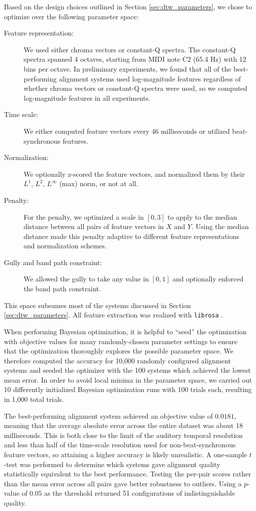 Based on the design choices outlined in Section \ref{sec:dtw_parameters}, we chose to optimize over the following parameter space:
\begin{description}
\item[Feature representation:] We used either chroma vectors or constant-Q spectra.
The constant-Q spectra spanned 4 octaves, starting from MIDI note C2 (65.4 Hz) with 12 bins per octave.
In preliminary experiments, we found that all of the best-performing alignment systems used log-magnitude features regardless of whether chroma vectors or constant-Q spectra were used, so we computed log-magnitude features in all experiments.
\item[Time scale:] We either computed feature vectors every 46 milliseconds or utilized beat-synchronous features.
\item[Normalization:] We optionally z-scored the feature vectors, and normalized them by their $L^1$, $L^2$, $L^\infty$ (max) norm, or not at all.
\item[Penalty:] For the penalty, we optimized a scale in $[0, 3]$ to apply to the median distance between all pairs of feature vectors in $X$ and $Y$.
Using the median distance made this penalty adaptive to different feature representations and normalization schemes.
\item[Gully and band path constraint:] We allowed the gully to take any value in $[0, 1]$ and optionally enforced the band path constraint.
\end{description}
This space subsumes most of the systems discussed in Section \ref{sec:dtw_parameters}.
All feature extraction was realized with \texttt{librosa} \cite{mcfee2015librosa, mcfee2015librosa_scipy}.

When performing Bayesian optimization, it is helpful to ``seed'' the optimization with objective values for many randomly-chosen parameter settings to ensure that the optimization thoroughly explores the possible parameter space.
We therefore computed the accuracy for 10,000 randomly configured alignment systems and seeded the optimizer with the 100 systems which achieved the lowest mean error.
In order to avoid local minima in the parameter space, we carried out 10 differently initialized Bayesian optimization runs with 100 trials each, resulting in 1,000 total trials.

The best-performing alignment system achieved an objective value of $0.0181$, meaning that the average absolute error across the entire dataset was about 18 milliseconds.
This is both close to the limit of the auditory temporal resolution and less than half of the time-scale resolution used for non-beat-synchronous feature vectors, so attaining a higher accuracy is likely unrealistic.
A one-sample $t$-test was performed to determine which systems gave alignment quality statistically equivalent to the best performance.
Testing the per-pair scores rather than the mean error across all pairs gave better robustness to outliers.
Using a $p$-value of $0.05$ as the threshold returned 51 configurations of indistinguishable quality.

